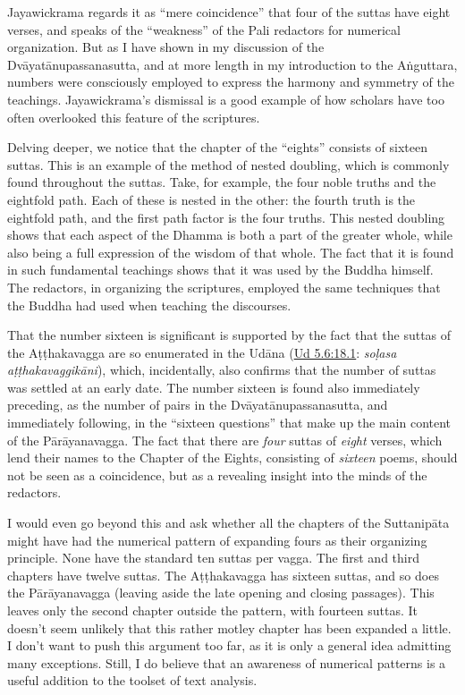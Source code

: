 \documentclass[12pt,openany]{book}%
\begin{document}
Jayawickrama regards it as “mere coincidence” that four of the suttas have eight verses, and speaks of the “weakness” of the Pali redactors for numerical organization. But as I have shown in my discussion of the \textsanskrit{Dvāyatānupassanasutta}, and at more length in my introduction to the \textsanskrit{Aṅguttara}, numbers were consciously employed to express the harmony and symmetry of the teachings. Jayawickrama’s dismissal is a good example of how scholars have too often overlooked this feature of the scriptures.

Delving deeper, we notice that the chapter of the “eights” consists of sixteen suttas. This is an example of the method of nested doubling, which is commonly found throughout the suttas. Take, for example, the four noble truths and the eightfold path. Each of these is nested in the other: the fourth truth is the eightfold path, and the first path factor is the four truths. This nested doubling shows that each aspect of the Dhamma is both a part of the greater whole, while also being a full expression of the wisdom of that whole. The fact that it is found in such fundamental teachings shows that it was used by the Buddha himself. The redactors, in organizing the scriptures, employed the same techniques that the Buddha had used when teaching the discourses.

That the number sixteen is significant is supported by the fact that the suttas of the \textsanskrit{Aṭṭhakavagga} are so enumerated in the \textsanskrit{Udāna} (\href{https://suttacentral.net/ud5.6/en/sujato\#18.1}{Ud 5.6:18.1}: \textit{\textsanskrit{soḷasa} \textsanskrit{aṭṭhakavaggikāni}}), which, incidentally, also confirms that the number of suttas was settled at an early date. The number sixteen is found also immediately preceding, as the number of pairs in the \textsanskrit{Dvāyatānupassanasutta}, and immediately following, in the “sixteen questions” that make up the main content of the \textsanskrit{Pārāyanavagga}. The fact that there are \emph{four} suttas of \emph{eight} verses, which lend their names to the Chapter of the Eights, consisting of \emph{sixteen} poems, should not be seen as a coincidence, but as a revealing insight into the minds of the redactors.

I would even go beyond this and ask whether all the chapters of the \textsanskrit{Suttanipāta} might have had the numerical pattern of expanding fours as their organizing principle. None have the standard ten suttas per vagga. The first and third chapters have twelve suttas. The \textsanskrit{Aṭṭhakavagga} has sixteen suttas, and so does the \textsanskrit{Pārāyanavagga} (leaving aside the late opening and closing passages). This leaves only the second chapter outside the pattern, with fourteen suttas. It doesn’t seem unlikely that this rather motley chapter has been expanded a little. I don’t want to push this argument too far, as it is only a general idea admitting many exceptions. Still, I do believe that an awareness of numerical patterns is a useful addition to the toolset of text analysis.
\end{document}
